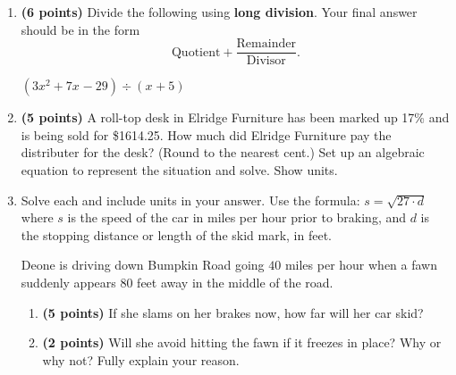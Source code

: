 \documentclass[12pt]{amsart}
\begin{document}
\begin{enumerate}
  
\vfill \vfill \vfill
\def \a{5}\def \b{3}\def \c{-8}\def \r{11}\def \monicpol{x^{}+5}\def \longnbad{3x^{2}+7x^{}-29}\def \anspol{3x^{}-8}
\item {\bf (6 points)} 
 Divide the following using {\bf long division}. Your final answer should be in the form $$ \text{Quotient} + \dfrac{\text{Remainder}}{\text{Divisor}}.$$

\vspace{3mm}

$(\longnbad) \div (\monicpol)$

\vfill  \vfill \vfill
\newpage\def \discount{17}\def \paid{1614.25}\def \rainy{10.87}\def \orcost{1944.88}\def \purcost{1379.70}\def \orrainy{13.10}
\item {\bf (5 points)} 
 A roll-top desk in Elridge Furniture has been marked up \discount\% and is being sold for \$\paid. How much did Elridge Furniture pay the distributer for the desk? (Round to the nearest cent.) Set up an algebraic equation to represent the situation and solve. Show units.

\vfill 
\def \insvar{27}\def \d{80}\def \zerospeed{46.48}\def \slimit{40}\def \s{54}\def \skidd{108.0}\def \safed{59.259}\def \rsafed{59}

 
\item Solve each and include units in your answer. Use the formula: $s = \sqrt{\insvar \cdot d}$ where $s$ is the speed of the car in miles per hour prior to braking, and $d$ is the stopping distance or length of the skid mark, in feet. 

\vspace{3mm}

Deone is driving down Bumpkin Road going $\slimit$ miles per hour when a fawn suddenly appears $\d$ feet away in the middle of the road. \begin{enumerate}
\item {\bf (5 points)} If she slams on her brakes now, how far will her car skid? \vspace{4cm}
\item {\bf (2 points)} Will she avoid hitting the fawn if it freezes in place? Why or why not? Fully explain your reason. \vspace{3cm}
\end{enumerate}



\end{enumerate}
\end{document}
